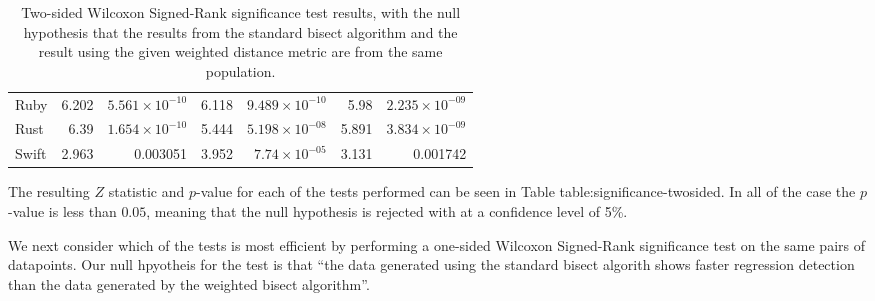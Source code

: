 \documentclass[10pt,journal,compsoc]{IEEEtran}
\begin{document}
\begin{table*}[t!]
\begin{center}
\begin{tabular}{l | r r | r r | r r}
Ruby & 6.202 & $5.561 \times 10^{-10}$ & 6.118 & $9.489 \times 10^{-10}$ & 5.98 & $2.235 \times 10^{-09}$ \\
Rust & 6.39 & $1.654 \times 10^{-10}$ & 5.444 & $5.198 \times 10^{-08}$ & 5.891 & $3.834 \times 10^{-09}$ \\
Swift & 2.963 & 0.003051 & 3.952 & $7.74 \times 10^{-05}$ & 3.131 & 0.001742 \\
\end{tabular}
\caption{\label{table:significance-twosided}Two-sided Wilcoxon Signed-Rank significance test results, with the null hypothesis that the results from the standard bisect algorithm and the result using the given weighted distance metric are from the same population.}
\end{center}
\end{table*}

The resulting $Z$ statistic and $p$-value for each of the tests performed can be seen in Table table:significance-twosided. In all of the case the $p$-value is less than $0.05$, meaning that the null hypothesis is rejected with at a confidence level of 5\%.

We next consider which of the tests is most efficient by performing a one-sided Wilcoxon Signed-Rank significance test on the same pairs of datapoints. Our null hpyotheis for the test is that ``the data generated using the standard bisect algorith shows faster regression detection than the data generated by the weighted bisect algorithm''.
\end{document}
